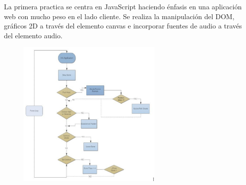 \documentclass[notes,slidesec,a4]{seminar}
\begin{document}

\begin{hslide}
La primera practica se centra en JavaScript haciendo énfasis en una aplicación web con mucho peso en el lado cliente. Se realiza la manipulación del DOM, gráﬁcos 2D a través del elemento canvas e incorporar fuentes de audio a través del elemento audio.
\end{hslide}

\begin{hslide}
\begin{minipage}{8cm}
\begin{center}
\begin{figure}
\includegraphics[width=7cm]{img/esquemaP1.pdf}
\end{figure}
\end{center}
\end{minipage}
\end{hslide}
\end{document}
